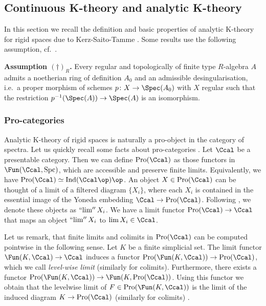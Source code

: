 \documentclass[colorinlistoftodos,article,11pt,reqno]{article}
\newcommand{\Pro}{\textup{Pro}}
\newcommand{\Spc}{\textup{Spc}}
\renewcommand{\to}[1][]{\overset{#1}{\rightarrow}}
\DeclareMathOperator*{\prolim}{``lim''}
\begin{document}
\subsection{Continuous K-theory and analytic K-theory}
\label{subsec.continuous-analytic-k-theory}
In this section we recall the definition and basic properties of analytic K-theory for rigid spaces due to Kerz-Saito-Tamme \cite{kst-i,kst-ii}. 
Some results use the following assumption, cf.\ \cite[\S 3.2]{kst-i}.

\vspace{6pt}\noindent\textbf{Assumption $(\dagger)_R$.}
\label{assumption-dagger}
Every regular and topologically of finite type $R$-algebra $A$ admits a noetherian ring of definition $A_0$ and an admissible desingularisation, i.e.\ a proper morphism of schemes $p\colon X\to\Spec(A_0)$ with $X$ regular such that the restriction $p^{-1}(\Spec(A))\to\Spec(A)$ is an isomorphism.

\subsubsection*{Pro-categories} \label{pro-categories--subsubsection}



Analytic K-theory of rigid spaces is naturally a pro-object in the category of spectra. Let us quickly recall some facts about pro-categories  \cite[\S A.8.1]{SAG}. Let $\Ccal$ be a presentable category. Then we can define $\Pro(\Ccal)$ as those functors in $\Fun(\Ccal,\Spc)$, which are accessible and preserve finite limits. Equivalently, we have $\Pro(\Ccal)\simeq \textup{Ind}(\Ccal\op)\op$. An object $X\in\Pro(\Ccal)$ can be thought of a limit of a filtered  diagram $\lbrace X_{i}\rbrace$, where each $X_{i}$ is contained in the essential image of the Yoneda embedding $\Ccal\rightarrow \Pro(\Ccal)$. Following \cite{kst-i}, we denote these objects as $\prolim X_{i}$.
We have a limit functor $\Pro(\Ccal)\rightarrow \Ccal$ that maps an object $\prolim X_i$ to $\lim X_i \in \Ccal$. 

Let us remark, that finite limits and colimits in $\Pro(\Ccal)$ can be computed pointwise in the following sense. Let $K$ be a finite simplicial set. The limit functor $\Fun(K,\Ccal)\to \Ccal$ induces a functor $\Pro(\Fun(K,\Ccal))\rightarrow \Pro(\Ccal)$, which we call \textit{level-wise limit} (similarly for colimits). Furthermore, there exists a functor $\Pro(\Fun(K,\Ccal))\rightarrow \Fun(K,\Pro(\Ccal))$. Using this functor we obtain that the levelwise limit of $F\in \Pro(\Fun(K,\Ccal))$ is the limit of the induced diagram $K\rightarrow \Pro(\Ccal)$ (similarly for colimits) \cite[Lem. 2.1]{kst-i}.
\end{document}
